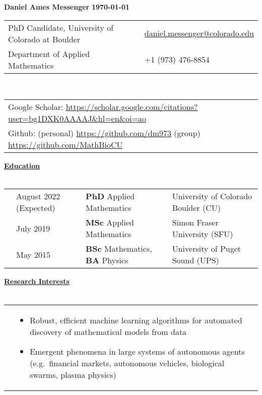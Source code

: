\documentclass[letterpaper,11pt,oneside]{article}
\newcommand{\headr}[1]{\vspace{10pt}\uline{\Large{\textbf{#1}} \hfill } \\ \vspace{-10pt}\\}
\begin{document}
%
\noindent 
\LARGE{\textbf{Daniel Ames Messenger} \hspace{2.5in} \textbf{\monthyeardate\today}}   \\
\normalsize
%
%
\begin{center}
\begin{tabular}{l l}
 PhD Candidate, University of Colorado at Boulder    & \hspace{1in} \href{mailto:daniel.messenger@colorado.edu}{daniel.messenger@colorado.edu} \\
Department of Applied Mathematics    & \hspace{1in}  +1 (973) 476-8854 \\
\end{tabular}\\ \vspace{0.5cm}
\begin{tabular}{l l}
Google Scholar: \url{https://scholar.google.com/citations?user=bg1DXK0AAAAJ&hl=en&oi=ao} & \\
Github: (personal) \url{https://github.com/dm973} \quad (group) \url{https://github.com/MathBioCU} &\\
\end{tabular}
\end{center}


\headr{Education}
 
\begin{tabular}{@{} p{0.01cm} p{4.2cm} p{5.5cm} p{8cm}}
& August 2022 (Expected) & \textbf{PhD} Applied Mathematics & University of Colorado Boulder (CU)\\ 
&July 2019 & \textbf{MSc} Applied Mathematics & Simon Fraser University (SFU)\\ 
&May 2015  & \textbf{BSc} Mathematics, \textbf{BA} Physics & University of Puget Sound (UPS)\\
\end{tabular}

\headr{Research Interests}
%
\begin{tabular}{@{} p{0.01cm} p{15cm}}
&\begin{itemize}
\item Robust, efficient machine learning algorithms for automated discovery of mathematical models from data
\item Emergent phenomena in large systems of autonomous agents (e.g.\ financial markets, autonomous vehicles, biological swarms, plasma physics) 
\end{itemize}
\end{tabular}
\end{document}
